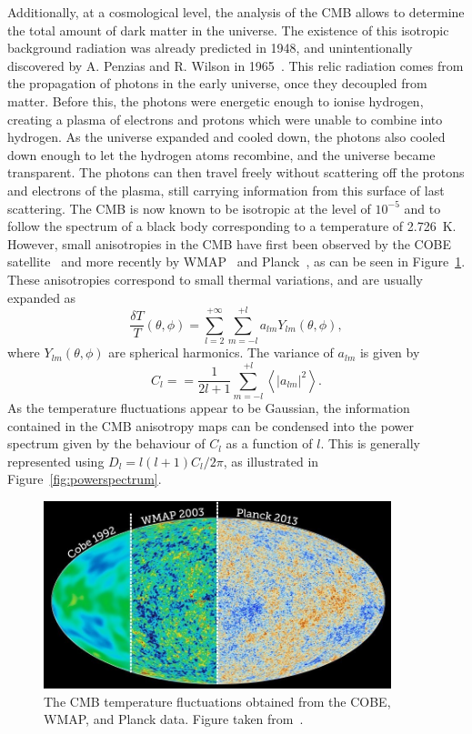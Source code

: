 Additionally, at a cosmological level, the analysis of the \ac{CMB} allows to determine the total amount of dark matter in the universe. The existence of this isotropic background radiation was already predicted in 1948, and unintentionally discovered by A. Penzias and R. Wilson in 1965~\cite{Penzias:1965wn}. This relic radiation comes from the propagation of photons in the early universe, once they decoupled from matter. Before this, the photons were energetic enough to ionise hydrogen, creating a plasma of electrons and protons which were unable to combine into hydrogen. As the universe expanded and cooled down, the photons also cooled down enough to let the hydrogen atoms recombine, and the universe became transparent. The photons can then travel freely without scattering off the protons and electrons of the plasma, still carrying information from this surface of last scattering. The \ac{CMB} is now known to be isotropic at the level of $10^{-5}$ and to follow the spectrum of a black body corresponding to a temperature of 2.726~K. However, small anisotropies in the \ac{CMB} have first been observed by the COBE satellite~\cite{Smoot:1992td} and more recently by WMAP~\cite{Komatsu:2010fb} and Planck~\cite{Ade:2013zuv}, as can be seen in Figure~\ref{fig:CMB}. These anisotropies correspond to small thermal variations, and are usually expanded as
\begin{equation}
 \frac{\delta T}{T}(\theta, \phi) = \sum_{l=2}^{+\infty}\sum_{m=-l}^{+l} a_{lm} Y_{lm}(\theta, \phi), 
\end{equation}
where $Y_{lm}(\theta, \phi)$ are spherical harmonics. %
The variance of $a_{lm}$ is given by
\begin{equation}
 C_l =  = \frac{1}{2l+1}\sum_{m=-l}^{+l} 
\left\langle|a_{lm}|^2\right\rangle.
\end{equation}
As the temperature fluctuations appear to be Gaussian, the information contained in the \ac{CMB} anisotropy maps can be condensed into the power spectrum given by the behaviour of $C_l$ as a function of $l$. This is generally represented using $D_l = l(l+1)C_l/2\pi$, as illustrated in Figure~\ref{fig:powerspectrum}.

\begin{figure}[ht]
  \centering
  \includegraphics[width=0.9\textwidth]{cmb1.jpg}\hfill%
  \caption{The \ac{CMB} temperature fluctuations obtained from the COBE, WMAP, and Planck data. Figure taken from~\cite{CMB}.}
  \label{fig:CMB}
\end{figure}

